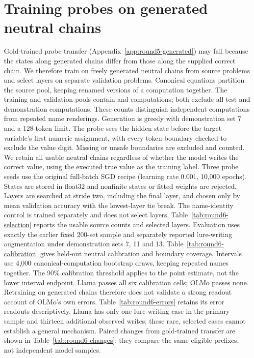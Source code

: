 \newsavebox{\roundsixbox}
\section{Training probes on generated neutral chains}
\label{app:round6-generated}
Gold-trained probe transfer (Appendix~\ref{app:round5-generated}) may fail because the states along generated chains differ from those along the supplied correct chain. We therefore train on freely generated neutral chains from  source problems and select layers on  separate validation problems. Canonical equations partition the source pool, keeping renamed versions of a computation together. The training and validation pools contain  and  computations; both exclude all test and demonstration computations. These counts distinguish independent computations from repeated name renderings.
Generation is greedy with demonstration set 7 and a 128-token limit. The probe sees the hidden state before the target variable's first numeric assignment, with every token boundary checked to exclude the value digit. Missing or unsafe boundaries are excluded and counted. We retain all usable neutral chains regardless of whether the model writes the correct value, using the executed true value as the training label. Three probe seeds use the original full-batch SGD recipe (learning rate 0.001, 10,000 epochs). States are stored in float32 and nonfinite states or fitted weights are rejected. Layers are searched at stride two, including the final layer, and chosen only by mean validation accuracy with the lowest-layer tie break. The name-identity control is trained separately and does not select layers.
Table~\ref{tab:round6-selection} reports the usable source counts and selected layers. Evaluation uses exactly the earlier fixed 200-set sample and separately reported lure-writing augmentation under demonstration sets 7, 11 and 13. Table~\ref{tab:round6-calibration} gives held-out neutral calibration and boundary coverage. Intervals use 4,000 canonical-computation bootstrap draws, keeping repeated names together. The 90\% calibration threshold applies to the point estimate, not the lower interval endpoint.
Llama passes all six calibration cells; OLMo passes none. Retraining on generated chains therefore does not validate a strong readout account of OLMo's own errors. Table~\ref{tab:round6-errors} retains its error readouts descriptively. Llama has only one lure-writing case in the primary sample and thirteen additional observed writes; these rare, selected cases cannot establish a general mechanism. Paired changes from gold-trained transfer are shown in Table~\ref{tab:round6-changes}; they compare the same eligible prefixes, not independent model samples.
